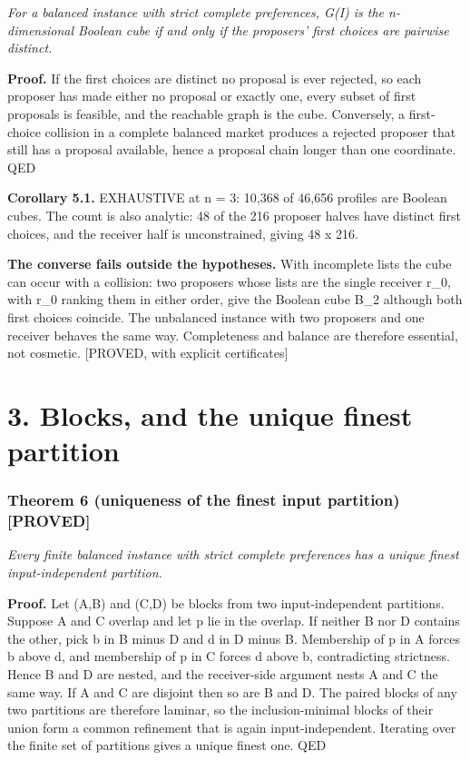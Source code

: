 \documentclass[
  11pt,
]{article}
\begin{document}
\emph{For a balanced instance with strict complete preferences, G(I) is
the n-dimensional Boolean cube if and only if the proposers' first
choices are pairwise distinct.}

\textbf{Proof.} If the first choices are distinct no proposal is ever
rejected, so each proposer has made either no proposal or exactly one,
every subset of first proposals is feasible, and the reachable graph is
the cube. Conversely, a first-choice collision in a complete balanced
market produces a rejected proposer that still has a proposal available,
hence a proposal chain longer than one coordinate. QED

\textbf{Corollary 5.1.} EXHAUSTIVE at n = 3: 10,368 of 46,656 profiles
are Boolean cubes. The count is also analytic: 48 of the 216 proposer
halves have distinct first choices, and the receiver half is
unconstrained, giving 48 x 216.

\textbf{The converse fails outside the hypotheses.} With incomplete
lists the cube can occur with a collision: two proposers whose lists are
the single receiver r\_0, with r\_0 ranking them in either order, give
the Boolean cube B\_2 although both first choices coincide. The
unbalanced instance with two proposers and one receiver behaves the same
way. Completeness and balance are therefore essential, not cosmetic.
{[}PROVED, with explicit certificates{]}

\clearpage

\hypertarget{blocks-and-the-unique-finest-partition}{%
\section{3. Blocks, and the unique finest
partition}\label{blocks-and-the-unique-finest-partition}}


\hypertarget{theorem-6-uniqueness-of-the-finest-input-partition-proved}{%
\subsubsection{Theorem 6 (uniqueness of the finest input partition)
{[}PROVED{]}}\label{theorem-6-uniqueness-of-the-finest-input-partition-proved}}

\emph{Every finite balanced instance with strict complete preferences
has a unique finest input-independent partition.}



\textbf{Proof.} Let (A,B) and (C,D) be blocks from two input-independent
partitions. Suppose A and C overlap and let p lie in the overlap. If
neither B nor D contains the other, pick b in B minus D and d in D minus
B. Membership of p in A forces b above d, and membership of p in C
forces d above b, contradicting strictness. Hence B and D are nested,
and the receiver-side argument nests A and C the same way. If A and C
are disjoint then so are B and D. The paired blocks of any two
partitions are therefore laminar, so the inclusion-minimal blocks of
their union form a common refinement that is again input-independent.
Iterating over the finite set of partitions gives a unique finest one.
QED
\end{document}
